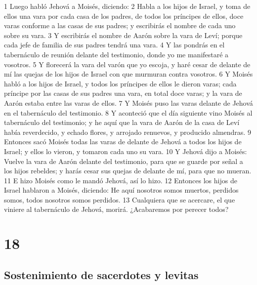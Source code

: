 1 Luego habló Jehová a Moisés, diciendo:
2 Habla a los hijos de Israel, y toma de ellos una vara por cada casa de los padres, de todos los príncipes de ellos, doce varas conforme a las casas de sus padres; y escribirás el nombre de cada uno sobre su vara.
3 Y escribirás el nombre de Aarón sobre la vara de Leví; porque cada jefe de familia de sus padres tendrá una vara.
4 Y las pondrás en el tabernáculo de reunión delante del testimonio, donde yo me manifestaré a vosotros.
5 Y florecerá la vara del varón que yo escoja, y haré cesar de delante de mí las quejas de los hijos de Israel con que murmuran contra vosotros.
6 Y Moisés habló a los hijos de Israel, y todos los príncipes de ellos le dieron varas; cada príncipe por las casas de sus padres una vara, en total doce varas; y la vara de Aarón estaba entre las varas de ellos.
7 Y Moisés puso las varas delante de Jehová en el tabernáculo del testimonio.
8 Y aconteció que el día siguiente vino Moisés al tabernáculo del testimonio; y he aquí que la vara de Aarón de la casa de Leví había reverdecido, y echado flores, y arrojado renuevos, y producido almendras. 
9 Entonces sacó Moisés todas las varas de delante de Jehová a todos los hijos de Israel; y ellos lo vieron, y tomaron cada uno su vara.
10 Y Jehová dijo a Moisés: Vuelve la vara de Aarón delante del testimonio, para que se guarde por señal a los hijos rebeldes; y harás cesar sus quejas de delante de mí, para que no mueran.
11 E hizo Moisés como le mandó Jehová, así lo hizo.
12 Entonces los hijos de Israel hablaron a Moisés, diciendo: He aquí nosotros somos muertos, perdidos somos, todos nosotros somos perdidos.
13 Cualquiera que se acercare, el que viniere al tabernáculo de Jehová, morirá. ¿Acabaremos por perecer todos?

\chapter{18}

\section*{Sostenimiento de sacerdotes y levitas}


